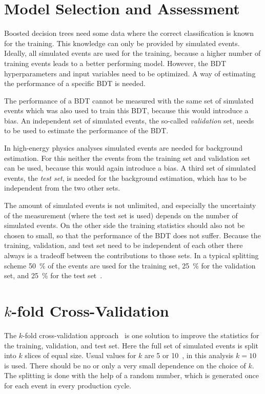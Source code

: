 \section{Model Selection and Assessment}\label{sec:mva:sets}

Boosted decision trees need some data where the correct classification is known for the training.
This knowledge can only be provided by simulated events.
Ideally, all simulated events are used for the training, because a higher number of training events
leads to a better performing model.
However, the BDT hyperparameters and input variables need to be optimized.
A way of estimating the performance of a specific BDT is needed.

The performance of a BDT cannot be measured with the same set of simulated events which was also used
to train this BDT, because this would introduce a bias.
An independent set of simulated events, the so-called \emph{validation} set, needs to be used to estimate
the performance of the BDT\@.

In high-energy physics analyses simulated events are needed for background estimation.
For this neither the events from the training set and validation set can be used, because this would again
introduce a bias.
A third set of simulated events, the \emph{test set}, is needed for the background estimation,
which has to be independent from the two other sets.

The amount of simulated events is not unlimited, and especially the uncertainty of the measurement (where the test set is used)
depends on the number of simulated events.
On the other side the training statistics should also not be chosen to small, so that the performance of the BDT
does not suffer.
Because the training, validation, and test set need to be independent of each other there always is a tradeoff
between the contributions to those sets.
In a typical splitting scheme \SI{50}{\percent} of the events are used for the training set, \SI{25}{\percent} for the validation set, and
\SI{25}{\percent} for the test set~\cite{Hastie2009}.

\section{$k$-fold Cross-Validation}\label{sec:mva:kfold-xval}

The $k$-fold cross-validation approach~\cite{Hastie2009} is one solution to improve the statistics for the training, validation, and
test set.
Here the full set of simulated events is split into $k$ slices of equal size.
Usual values for $k$ are 5 or 10~\cite{Hastie2009}, in this analysis $k=10$ is used.
There should be no or only a very small dependence on the choice of $k$.
The splitting is done with the help of a random number, which is generated once for each event in every production cycle.

